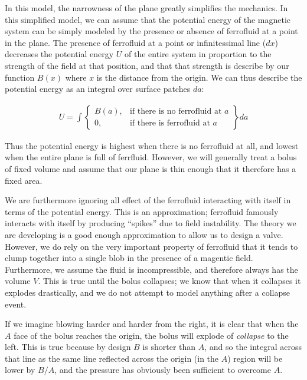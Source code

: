 \documentclass{asme2ej}
\begin{document}
In this model, the narrowness of the plane greatly simplifies the mechanics.
In this simplified model, we can assume
that the potential energy of the magnetic system can be simply
modeled by the presence or absence of ferrofluid at a point in the plane.
The presence of ferrofluid at a point or infinitessimal line ($dx$) decreases the potential energy $U$
of the entire system in proportion to the strength of the field at that position,
and that that strength is describe by our function $B(x)$ where $x$ is the
distance from the origin.
We can thus describe the potential energy as an integral over surface patches $da$:

\begin{align}
  U = \int
\left\{
    \begin{array}{lr}
      B(a)  , & \text{if there is no ferrofluid at } a \\
      0 , & \text{if there is ferrofluid at } a
    \end{array}
\right\} da
\end{align}

Thus the potential energy is highest when there is no ferrofluid at all,
and lowest when the entire plane is full of ferrfluid.
However, we will generally treat a bolus of fixed volume and assume
that our plane is thin enough that it therefore has a fixed area.


We are furthermore ignoring all effect of the ferrofluid
interacting with itself in terms
of the potential energy.
This is an approximation; ferrofluid famously interacts with itself
by producing ``spikes'' due to field instability.
The theory we are developing is a good enough approximation
to allow us to design a valve.
However, we do rely on the very important property of ferrofluid that
it tends to clump together into a single blob in the presence
of a magentic field.
Furthermore,
we assume the fluid is incompressible,
and therefore always has the volume $V$.
This is true until the bolus collapses; we know that
when it collapses it explodes drastically,
and we do not attempt to model anything after
a collapse event.

If we imagine blowing harder and harder from the right, it is
clear that when the $A$ face of the bolus reaches the origin,
the bolus will explode of {\em collapse} to the left.
This is true because by design $B$ is shorter than $A$, and
so the integral across that line as the same line reflected across
the origin (in the $A$) region will be lower by $B/A$, and the pressure
has obviously been sufficient to overcome $A$.
\end{document}
